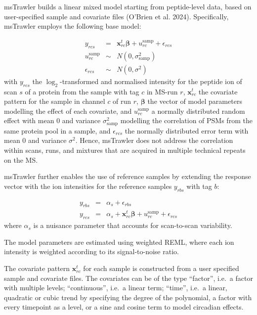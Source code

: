 \documentclass[
  letterpaper,
  DIV=11,
  numbers=noendperiod]{scrartcl}
\begin{document}
msTrawler builds a linear mixed model starting from peptide-level data,
based on user-specified sample and covariate files (O'Brien et al.
2024). Specifically, msTrawler employs the following base model:

\[
\begin{array}{lcl}
y_{rcs} &=& \mathbf{x}_{rc}^t \boldsymbol{\beta} + u_{rc}^\text{samp} +
\epsilon_{rcs}\\
u_{rc}^\text{samp}&\sim& N(0,\sigma^2_\text{samp})\\
\epsilon_{rcs} &\sim& N(0,\sigma^2)
\end{array}
\] with \(y_{rcs}\) the \(\log_2\)-transformed and normalised intensity
for the peptide ion of scan \(s\) of a protein from the sample with tag
\(c\) in MS-run \(r\), \(\mathbf{x}_{rc}^t\) the covariate pattern for
the sample in channel \(c\) of run \(r\), \(\boldsymbol{\beta}\) the
vector of model parameters modelling the effect of each covariate, and
\(u_{rc}^\text{samp}\) a normally distributed random effect with mean 0
and variance \(\sigma^2_\text{samp}\) modelling the correlation of PSMs
from the same protein pool in a sample, and \(\epsilon_{rcs}\) the
normally distributed error term with mean 0 and variance \(\sigma^2\).
Hence, msTrawler does not address the correlation within scans, runs,
and mixtures that are acquired in multiple technical repeats on the MS.

msTrawler further enables the use of reference samples by extending the
response vector with the ion intensities for the reference samples
\(y_{rbs}\) with tag \(b\):

\[
\begin{array}{lcl}
y_{rbs} &=& \alpha_s + \epsilon_{rbs}\\
y_{rcs} &=& \alpha_s + \mathbf{x}_{rc}^t \boldsymbol{\beta} + u_{rc}^\text{samp} +
\epsilon_{rcs}
\end{array}
\] where \(\alpha_s\) is a nuisance parameter that accounts for
scan-to-scan variability.

The model parameters are estimated using weighted REML, where each ion
intensity is weighted according to its signal-to-noise ratio.

The covariate pattern \(\mathbf{x}_{rc}^t\) for each sample is
constructed from a user specified sample and covariate files. The
covariates can be of the type ``factor'', i.e.~a factor with multiple
levels; ``continuous'', i.e.~a linear term; ``time'', i.e.~a linear,
quadratic or cubic trend by specifying the degree of the polynomial, a
factor with every timepoint as a level, or a sine and cosine term to
model circadian effects.
\end{document}
